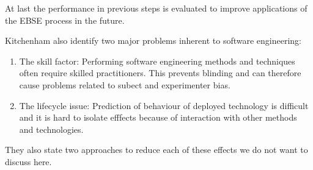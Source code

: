 At last the performance in previous steps is evaluated to improve applications  of the EBSE process in the future.

Kitchenham \etal \cite{EBSE} also identify two major problems inherent to software engineering:
\begin{enumerate}
\item The skill factor: Performing software engineering methods and techniques often require skilled practitioners. This prevents blinding and can therefore cause problems related to subect and experimenter bias.
\item The lifecycle issue: Prediction of behaviour  of deployed technology is difficult and it is hard to isolate efffects because of interaction with other methods and technologies.
\end{enumerate}

They also state two approaches to reduce each of these effects we do not want to discuss here.


